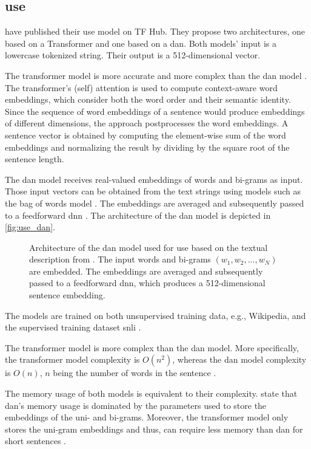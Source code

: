 \subsection{\ac{use}}\label{subsec:univ-sent-encoder}

\citeauthor{UniversalSentEnc2018} have published their \ac{use} model on TF Hub.
They propose two architectures, one based on a Transformer and one based on a \ac{dan}.
Both models' input is a lowercase tokenized string.
Their output is a 512-dimensional vector.

The transformer model is more accurate and more complex than the \ac{dan} model \cite{UniversalSentEnc2018}.
The transformer's (self) attention is used to compute context-aware word embeddings, which consider both the word order and their semantic identity.
Since the sequence of word embeddings of a sentence would produce embeddings of different dimensions, the approach postprocesses the word embeddings.
A sentence vector is obtained by computing the element-wise sum of the word embeddings 
and normalizing the result by dividing by the square root of the sentence length.

The \ac{dan} model receives real-valued embeddings of words and bi-grams as input.
Those input vectors can be obtained from the text strings using models such as the bag of words model \cite{UniversalSentEnc-dan-input-emb}.
The embeddings are averaged and subsequently passed to a feedforward \ac{dnn} \cite{UniversalSentEnc2018}.
The architecture of the \ac{dan} model is depicted in \autoref{fig:use_dan}.

\begin{figure}[htp] %
    \centering
    
    \caption{Architecture of the \ac{dan} model used for \ac{use} based on the textual description from \cite{inferSent2018}.
    The input words and bi-grams $(w_1, w_2, ..., w_N)$ are embedded.
    The embeddings are averaged and subsequently passed to a feedforward \ac{dnn}, which produces a 512-dimensional sentence embedding.
    }
    \label{fig:use_dan}
\end{figure}

The models are trained on both unsupervised training data, e.g., Wikipedia, and the supervised training dataset \ac{snli} \cite{UniversalSentEnc2018, HfsentTrans2019}.

The transformer model is more complex than the \ac{dan} model.
More specifically, the transformer model complexity is $O(n^2)$, whereas the \ac{dan} model complexity is $O(n)$, 
$n$ being the number of words in the sentence \cite{UniversalSentEnc2018}.

The memory usage of both models is equivalent to their complexity.
\citeauthor{UniversalSentEnc2018} state that \ac{dan}'s memory usage is dominated by the parameters used to store the embeddings of the uni- and bi-grams.
Moreover, the transformer model only stores the uni-gram embeddings and thus, can require less memory than \ac{dan} for short sentences \cite{UniversalSentEnc2018}.